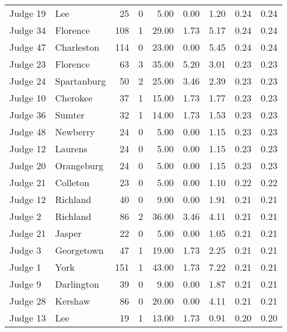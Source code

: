 \begin{tabular}{llrrrrrrr}
Judge 19 &          Lee &    25 &      0 &  5.00 &       0.00 &      1.20 &         0.24 &      0.24 \\
Judge 34 &     Florence &   108 &      1 & 29.00 &       1.73 &      5.17 &         0.24 &      0.24 \\
Judge 47 &   Charleston &   114 &      0 & 23.00 &       0.00 &      5.45 &         0.24 &      0.24 \\
Judge 23 &     Florence &    63 &      3 & 35.00 &       5.20 &      3.01 &         0.23 &      0.23 \\
Judge 24 &  Spartanburg &    50 &      2 & 25.00 &       3.46 &      2.39 &         0.23 &      0.23 \\
Judge 10 &     Cherokee &    37 &      1 & 15.00 &       1.73 &      1.77 &         0.23 &      0.23 \\
Judge 36 &       Sumter &    32 &      1 & 14.00 &       1.73 &      1.53 &         0.23 &      0.23 \\
Judge 48 &     Newberry &    24 &      0 &  5.00 &       0.00 &      1.15 &         0.23 &      0.23 \\
Judge 12 &      Laurens &    24 &      0 &  5.00 &       0.00 &      1.15 &         0.23 &      0.23 \\
Judge 20 &   Orangeburg &    24 &      0 &  5.00 &       0.00 &      1.15 &         0.23 &      0.23 \\
Judge 21 &     Colleton &    23 &      0 &  5.00 &       0.00 &      1.10 &         0.22 &      0.22 \\
Judge 12 &     Richland &    40 &      0 &  9.00 &       0.00 &      1.91 &         0.21 &      0.21 \\
 Judge 2 &     Richland &    86 &      2 & 36.00 &       3.46 &      4.11 &         0.21 &      0.21 \\
Judge 21 &       Jasper &    22 &      0 &  5.00 &       0.00 &      1.05 &         0.21 &      0.21 \\
 Judge 3 &   Georgetown &    47 &      1 & 19.00 &       1.73 &      2.25 &         0.21 &      0.21 \\
 Judge 1 &         York &   151 &      1 & 43.00 &       1.73 &      7.22 &         0.21 &      0.21 \\
 Judge 9 &   Darlington &    39 &      0 &  9.00 &       0.00 &      1.87 &         0.21 &      0.21 \\
Judge 28 &      Kershaw &    86 &      0 & 20.00 &       0.00 &      4.11 &         0.21 &      0.21 \\
Judge 13 &          Lee &    19 &      1 & 13.00 &       1.73 &      0.91 &         0.20 &      0.20 \\

\end{tabular}
